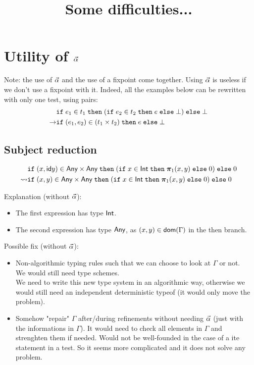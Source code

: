 \documentclass[a4paper]{article}
\title{\vspace{1.5cm}Some difficulties...}
\author{}
\date{\vspace{-5ex}}
\theoremstyle{definition}
\begin{document}
  \maketitle

  \newcommand{\id} {\textsf{id}}
  
    \section{Utility of $\vec \alpha$}

    Note: the use of $\vec \alpha$ and the use of a fixpoint come together.
    Using $\vec \alpha$ is useless if we don't use a fixpoint with it.
    Indeed, all the examples below can be rewritten with only one test, using pairs:
    \begin{align*}
      &\texttt{if}\;e_1\in t_1\;\texttt{then}\;(\texttt{if}\;e_2\in t_2\;\texttt{then}\;e\;\texttt{else}\;\bot)\;\texttt{else}\;\bot\\
      \to& \texttt{if}\;(e_1,e_2)\in(t_1\times t_2)\;\texttt{then}\;e\;\texttt{else}\;\bot
    \end{align*}

    \subsection{Subject reduction}

    \begin{align*}
      &\ite {(x,\id y)} {\pair \Any \Any}
      {
        (\ite x \Int {\bpi_1 (x,y)} 0)
      } 0\\
      \leadsto
      &\ite {(x,y)} {\pair \Any \Any}
      {
        (\ite x \Int {\bpi_1 (x,y)} 0)
      } 0
    \end{align*}

    Explanation (without $\vec \alpha$):
    \begin{itemize}
      \item The first expression has type $\text{\textsf{Int}}$.
      \item The second expression has type $\textsf{Any}$, as $(x,y) \in \textsf{dom}(\Gamma)$ in the then branch.
    \end{itemize}

    Possible fix (without $\vec \alpha$):
    \begin{itemize}
      \item Non-algorithmic typing rules such that we can choose to look at $\Gamma$ or not.\\
      We would still need type schemes.\\
      We need to write this new type system in an algorithmic way,
      otherwise we would still need an independent deterministic typeof (it would only move the problem).
      \item Somehow "repair" $\Gamma$ after/during refinements without needing $\vec \alpha$ (just with the informations in $\Gamma$).
      It would need to check all elements in $\Gamma$ and strenghten them if needed.
      Would not be well-founded in the case of a ite statement in a test. So it seems more complicated and it does not solve any problem.
    \end{itemize}
\end{document}
